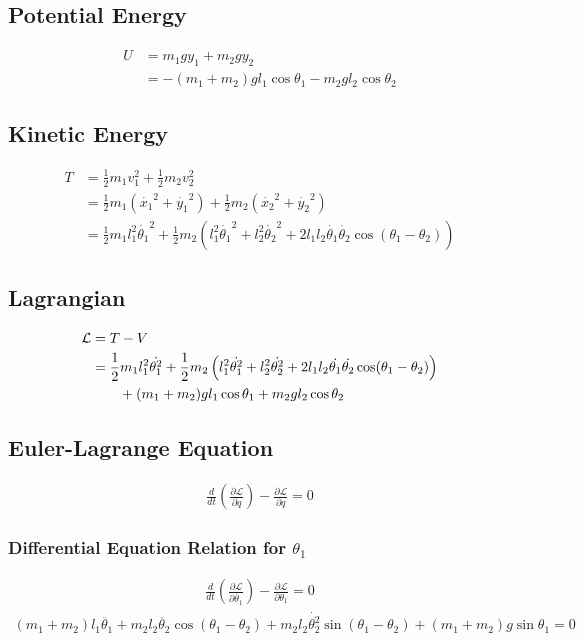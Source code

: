 \documentclass[12pt]{article}
\newcommand{\Lagr}{\mathcal{L}}
\begin{document}
\subsection{Potential Energy}
\begin{align}
    U &= m_1 g y_1 + m_2 g y_2 \\
    &= -(m_1+m_2)g l_1 \cos \theta_1 - m_2 g l_2 \cos \theta_2
\end{align}

\subsection{Kinetic Energy}
\begin{align}
    T &= \frac{1}{2} m_1 v_1^2 + \frac{1}{2} m_2 v_2^2 \\
    &= \frac{1}{2} m_1 (\dot{x_1}^2 + \dot{y_1}^2) + \frac{1}{2} m_2 (\dot{x_2}^2 + \dot{y_2}^2) \\
    &= \frac{1}{2} m_1 l_1^2 \dot{\theta_1}^2 + \frac{1}{2} m_2 \left( l_1^2 \dot{\theta_1}^2 + l_2^2 \dot{\theta_2}^2 + 2 l_1 l_2 \dot{\theta_1} \dot{\theta_2} \cos (\theta_1 - \theta_2) \right)
\end{align}

\subsection{Lagrangian}
\begin{align}
    \Lagr &= T - V \\
    &= \frac{1}{2} m_1 l_1^2 \dot{\theta_1^2} + \frac{1}{2} m_2 \left( l_1^2 \dot{\theta_1^2} + l_2^2 \dot{\theta_2^2} + 2 l_1 l_2 \dot{\theta_1} \dot{\theta_2} \cos (\theta_1 - \theta_2) \right) \\
    &\qquad+ (m_1 + m_2) g l_1 \cos \theta_1 + m_2 g l_2 \cos \theta_2 \notag
\end{align}

\subsection{Euler-Lagrange Equation}
\begin{align}
    \frac{d}{dt} \left( \frac{\partial \Lagr}{\partial \dot{q}} \right) - \frac{\partial \Lagr}{\partial q} = 0
\end{align}

\subsubsection{Differential Equation Relation for \(\theta_1\)}
\begin{align}
    \frac{d}{dt} \left( \frac{\partial \Lagr}{\partial \dot{\theta_1}} \right) - \frac{\partial \Lagr}{\partial \theta_1} = 0
\end{align}
\begin{align}
    (m_1 + m_2) l_1 \ddot{\theta_1} + m_2 l_2 \ddot{\theta_2} \cos (\theta_1 - \theta_2) + m_2 l_2 \dot{\theta_2^2} \sin (\theta_1 - \theta_2) + (m_1 + m_2) g \sin \theta_1 = 0
\end{align}
\end{document}
